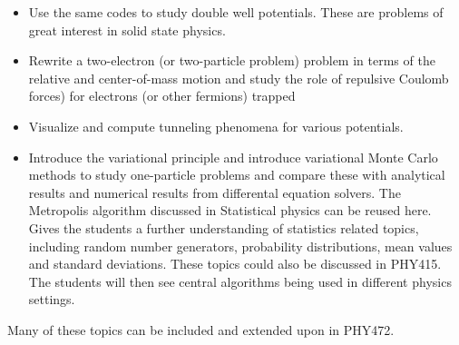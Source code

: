 \begin{itemize}
\item Use the same codes to study double well potentials. These are problems of great interest in solid state physics.

\item Rewrite a two-electron (or two-particle problem) problem in terms of the relative and center-of-mass motion and study the role of repulsive Coulomb forces) for electrons (or other fermions) trapped

\item Visualize and compute tunneling phenomena for various potentials.

\item Introduce the  variational principle and introduce variational Monte Carlo methods to study one-particle problems and compare these with analytical results and numerical results from differental equation solvers.  The Metropolis algorithm discussed in Statistical physics can be reused here. Gives the students a further understanding of statistics related topics, including random number generators, probability distributions, mean values and standard deviations. These topics could also be discussed in PHY415. The students will then see central algorithms being used in different physics settings.
\end{itemize}

\noindent
Many of these topics can be included and extended upon in PHY472.

